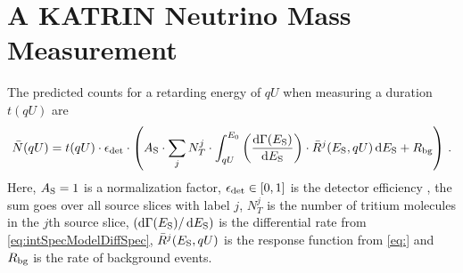 \def\currentRootFolder{chapter/modelOfIntegratedRate/neutrinoMassMeasurement}
\def\currentFigureFolder{\currentRootFolder/fig}



\section{A KATRIN Neutrino Mass Measurement}
\label{sec:katrinExpNuMassMeasurement}
The predicted counts for a retarding energy of $qU$ when measuring a duration $t(qU)$ are
\begin{equation}
\label{eq:intSpecModelCountsFinal}
\bar{N}(qU) = t(qU) \cdot \epsilon_\mathrm{det} \cdot \left(
A_\mathrm{S} \cdot
\sum_{j}
N_T^j \cdot
\int_{qU}^{E_0} 
\left(\frac{\mathop{}\!\mathrm{d} \Gamma(E_\mathrm{S})}{ \mathop{}\!\mathrm{d} E_\mathrm{S}}\right) \cdot 
\bar{R}^j(E_\mathrm{S}, qU) 
\mathop{}\!\mathrm{d} E_\mathrm{S} +
R_\mathrm{bg}
\right)
\text{\,.}
\end{equation}
Here, $A_\mathrm{S}=1$ is a normalization factor, $\epsilon_\mathrm{det} \in [0,1]$ is the detector efficiency , the sum goes over all source slices with label $j$, $N_T^j$ is the number of tritium molecules in the $j$th source slice, $\left(\mathop{}\!\mathrm{d} \Gamma(E_\mathrm{S}) / \mathop{}\!\mathrm{d} E_\mathrm{S} \right)$ is the differential rate from \eqref{eq:intSpecModelDiffSpec}, $\bar{R}^j(E_\mathrm{S}, qU)$ is the response function from \eqref{eq:} and $R_\mathrm{bg}$ is the rate of background events.

